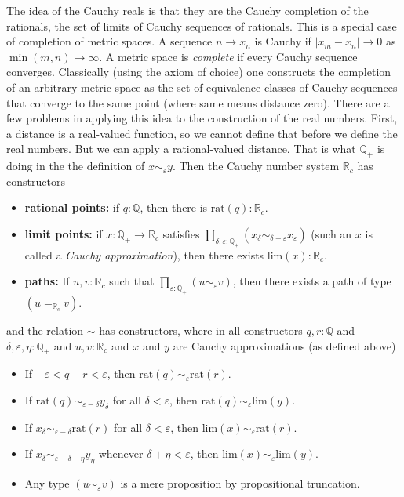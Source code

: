 \documentclass[11pt]{article}
\newcommand{\real}{\mathbb{R}}
\newcommand{\rats}{\mathbb{Q}}
\begin{document}
The idea of the Cauchy reals is that they are the Cauchy completion of
the rationals, the set of limits of Cauchy sequences of rationals.
This is a special case of completion of metric spaces.
A sequence $n \to x_n$ is Cauchy if $\lvert x_m - x_n \rvert \to 0$ as
$\min(m, n) \to \infty$.
A metric space is \emph{complete} if every Cauchy sequence converges.
Classically (using the axiom of choice) one constructs the completion
of an arbitrary metric space as the set of equivalence classes of Cauchy
sequences that converge to the same point (where same means distance zero).
There are a few problems in applying this idea to the construction of the
real numbers.  First, a distance is a real-valued function, so we cannot
define that before we define the real numbers.  But we can apply
a rational-valued distance.  That is what $\rats_+$ is doing in the
the definition of $x \sim_\varepsilon y$.
Then 
the Cauchy number system $\real_c$ has constructors
\begin{itemize}
\item \textbf{rational points:} if $q : \rats$,
    then there is $\text{rat}(q) : \real_c$.
\item \textbf{limit points:} if $x : \rats_+ \to \real_c$
    satisfies $\prod_{\delta, \varepsilon : \rats_+}
    (x_\delta \sim_{\delta + \varepsilon} x_\varepsilon)$
    (such an $x$ is called a \emph{Cauchy approximation}),
    then there exists $\text{lim}(x) : \real_c$.
\item \textbf{paths:} If $u, v : \real_c$
    such that $\prod_{\varepsilon : \rats_+} (u \sim_\varepsilon v)$,
    then there exists a path of type $(u =_{\real_c} v)$.
\end{itemize}
and the relation $\sim$ has constructors, where in all constructors
$q, r : \rats$ and $\delta, \varepsilon, \eta : \rats_+$ and $u, v : \real_c$
and $x$ and $y$ are Cauchy approximations (as defined above)
\begin{itemize}
\item If $- \varepsilon < q - r < \varepsilon$,
    then $\text{rat}(q) \sim_\varepsilon \text{rat}(r)$.
\item If $\text{rat}(q) \sim_{\varepsilon - \delta} y_\delta$ for all
    $\delta < \varepsilon$,
    then $\text{rat}(q) \sim_\varepsilon \text{lim}(y)$.
\item If $x_\delta \sim_{\varepsilon - \delta} \text{rat}(r)$ for all
    $\delta < \varepsilon$,
    then $\text{lim}(x) \sim_\varepsilon \text{rat}(r)$.
\item If $x_\delta \sim_{\varepsilon - \delta - \eta} y_\eta$ whenever
    $\delta + \eta < \varepsilon$,
    then $\text{lim}(x) \sim_\varepsilon \text{lim}(y)$.
\item Any type $(u \sim_\varepsilon v)$ is a mere proposition
    by propositional truncation.
\end{itemize}
\end{document}

